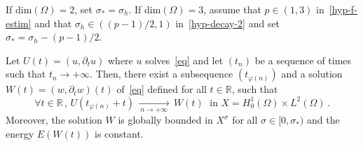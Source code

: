 \documentclass[AHL,Unicode,longabstracts]{cedram}
\newcommand{\RR}{\mathbb{R}}
\let\oldforall\forall
\renewcommand*{\forall}{\mathrel{\oldforall}}
\begin{document}
\begin{prop}\label{prop-asymp-compact-1}
If dim$(\Omega)=2$, set $\sigma_*=\sigma_h$. If dim$(\Omega)=3$, assume that $p\in(1,3)$ in~\eqref{hyp-f-estim} and that $\sigma_h\in ((p-1)/2,1)$ in~\eqref{hyp-decay-2} and set $\sigma_*=\sigma_h - (p-1)/2$.

Let $U(t)=(u,\partial_t u)$ where $u$ solves~\eqref{eq} and let $(t_n)$ be a sequence of times such that $t_n\rightarrow +\infty$. Then, there exist a subsequence $(t_{\varphi(n)})$ and a solution $W(t)=(w,\partial_t w)(t)$ of~\eqref{eq} defined for all $t\in\RR$, such that
\[
\forall
t\in\RR\,,\,U(t_{\varphi(n)}+t)\,\xrightarrow[\:n\longrightarrow
+\infty\;]{}\,W(t)\;\text{ in }X=H^1_0(\Omega)\times L^2(\Omega)\,.
\]
Moreover, the solution $W$ is globally bounded in $X^\sigma$ for all $\sigma\in [0,\sigma_*)$ and the energy $E(W(t))$ is constant.
\end{prop}
\end{document}
